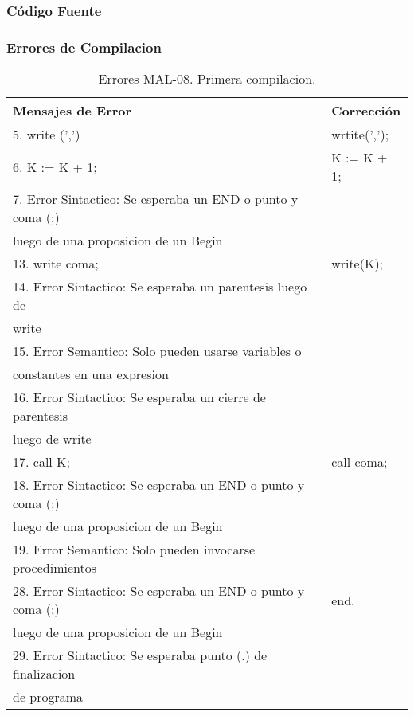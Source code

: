 \documentclass[a4paper,12pt]{article}
\begin{document}
\subsubsection{Código Fuente}

\subsubsection{Errores de Compilacion}

\begin{table}[H]
\centering
\begin{tabular}{|l|l|}
\hline
Mensajes de Error & Corrección\\
\hline
5. write (',')												& wrtite(',');\\
6. K := K + 1;												& K := K + 1;\\
7. Error Sintactico: Se esperaba un END o punto y coma (;) 	&\\
luego de una proposicion de un Begin							&\\
\hline
13. write coma;												&write(K);\\
14. Error Sintactico: Se esperaba un parentesis luego de		&\\
write 														&\\
15. Error Semantico: Solo pueden usarse variables o			&\\
constantes en una expresion									&\\
16. Error Sintactico: Se esperaba un cierre de parentesis 	&\\
luego de write 												&\\
\hline
17. call K;													& call coma;\\
18. Error Sintactico: Se esperaba un END o punto y coma (;)	&\\
luego de una proposicion de un Begin							&\\
19. Error Semantico: Solo pueden invocarse procedimientos		&\\
\hline
28. Error Sintactico: Se esperaba un END o punto y coma (;)	&end.\\
luego de una proposicion de un Begin							&\\
29. Error Sintactico: Se esperaba punto (.) de finalizacion	&\\
 de programa													&\\
\hline
\end{tabular}
\caption{Errores MAL-08. Primera compilacion.}
\label{MAL-08-1}
\end{table}
\end{document}
